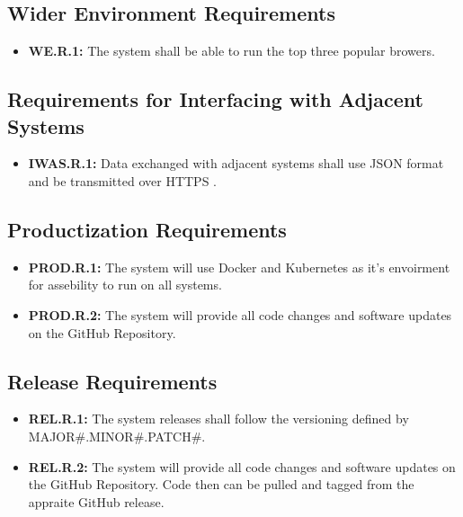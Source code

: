 \documentclass[12pt]{article}
\begin{document}
\subsection{Wider Environment Requirements}

\begin{itemize}
    \item \textbf{WE.R.1:}\label{req:we.r.1} The system shall be able to run the top three popular browers.
\end{itemize}


\subsection{Requirements for Interfacing with Adjacent Systems}

\begin{itemize}
    \item \textbf{IWAS.R.1:}\label{req:iwas.r.1} Data exchanged with adjacent systems shall use JSON format and be transmitted over HTTPS \cite{HTTPSecurity2023}.
\end{itemize}

\subsection{Productization Requirements}
\begin{itemize}
    \item \textbf{PROD.R.1:}\label{req:prod.r.1} The system will use Docker and Kubernetes as it's envoirment for assebility to run on all systems.
    \item \textbf{PROD.R.2:} The system will provide all code changes and software updates on the GitHub Repository. 
\end{itemize}

\subsection{Release Requirements}
\begin{itemize}
    \item \textbf{REL.R.1:}\label{req:rel.r.1} The system releases shall follow the versioning defined by MAJOR\#.MINOR\#.PATCH\#.
    \item \textbf{REL.R.2:}\label{req:rel.r.2} The system will provide all code changes and software updates on the GitHub Repository. Code then can be pulled and tagged from the appraite GitHub release.
\end{itemize}
\end{document}
